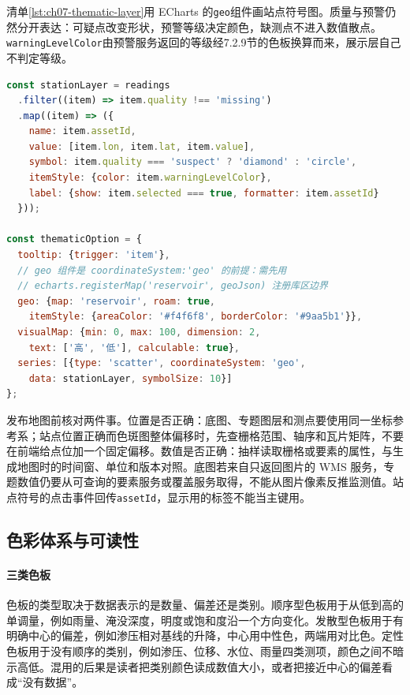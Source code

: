 清单\ref{lst:ch07-thematic-layer}用 ECharts 的\texttt{geo}组件画站点符号图。质量与预警仍然分开表达：可疑点改变形状，预警等级决定颜色，缺测点不进入数值散点。\texttt{warningLevelColor}由预警服务返回的等级经7.2.9节的色板换算而来，展示层自己不判定等级。

\begin{lstlisting}[label={lst:ch07-thematic-layer},language=JavaScript,breaklines=true,caption={专题地图图层与站点符号配置}]
const stationLayer = readings
  .filter((item) => item.quality !== 'missing')
  .map((item) => ({
    name: item.assetId,
    value: [item.lon, item.lat, item.value],
    symbol: item.quality === 'suspect' ? 'diamond' : 'circle',
    itemStyle: {color: item.warningLevelColor},
    label: {show: item.selected === true, formatter: item.assetId}
  }));

const thematicOption = {
  tooltip: {trigger: 'item'},
  // geo 组件是 coordinateSystem:'geo' 的前提：需先用
  // echarts.registerMap('reservoir', geoJson) 注册库区边界
  geo: {map: 'reservoir', roam: true,
    itemStyle: {areaColor: '#f4f6f8', borderColor: '#9aa5b1'}},
  visualMap: {min: 0, max: 100, dimension: 2,
    text: ['高', '低'], calculable: true},
  series: [{type: 'scatter', coordinateSystem: 'geo',
    data: stationLayer, symbolSize: 10}]
};
\end{lstlisting}

发布地图前核对两件事。位置是否正确：底图、专题图层和测点要使用同一坐标参考系；站点位置正确而色斑图整体偏移时，先查栅格范围、轴序和瓦片矩阵，不要在前端给点位加一个固定偏移。数值是否正确：抽样读取栅格或要素的属性，与生成地图时的时间窗、单位和版本对照。底图若来自只返回图片的 WMS 服务，专题数值仍要从可查询的要素服务或覆盖服务取得，不能从图片像素反推监测值。站点符号的点击事件回传\texttt{assetId}，显示用的标签不能当主键用。

\subsection{色彩体系与可读性}

\paragraph{三类色板}色板的类型取决于数据表示的是数量、偏差还是类别。顺序型色板用于从低到高的单调量，例如雨量、淹没深度，明度或饱和度沿一个方向变化。发散型色板用于有明确中心的偏差，例如渗压相对基线的升降，中心用中性色，两端用对比色。定性色板用于没有顺序的类别，例如渗压、位移、水位、雨量四类测项，颜色之间不暗示高低。混用的后果是读者把类别颜色读成数值大小，或者把接近中心的偏差看成“没有数据”。

